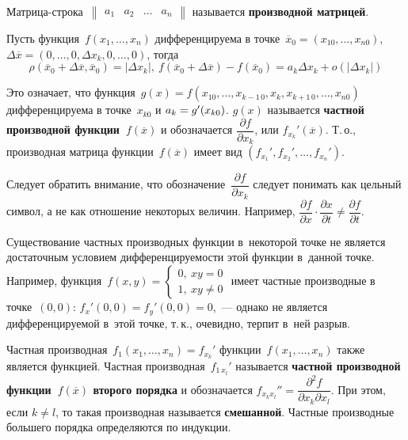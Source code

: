  Матрица-строка~$\begin{Vmatrix}
a_1 & a_2 & \ldots & a_n
\end{Vmatrix}$ называется \textbf{производной матрицей}.

Пусть функция~$f(x_1, \ldots, x_n)$ дифференцируема в точке~$\overline x_0 = (x_{10}, \ldots, x_{n0})$, $\Delta \overline x = (0, \ldots, 0, \Delta x_k, 0, \ldots, 0)$, тогда
\begin{equation*}
\rho(\overline x_0 + \Delta \overline x, \overline x_0) = |\Delta x_k|, \
f(\overline x_0 + \Delta \overline x) - f(\overline x_0) =
a_k \Delta x_k + o(|\Delta x_k|)
\end{equation*}

Это означает, что функция~$g(x) = f(x_{10}, \ldots, x_{k-1\, 0}, x_k, x_{k+1\, 0}, \ldots, x_{n0})$ дифференцируема в точке~$x_{k0}$ и $a_k \opbr= g'(x_{k0})$.
\index{Производная!частная} $g(x)$ называется \textbf{частной производной функции~$f(\overline x)$} и обозначается $\dfrac{\partial f}{\partial x_k}$, или $f_{x_k}'(\overline x)$.
Т.\,о., производная матрица функции~$f(\overline x)$ имеет вид $(f_{x_1}', f_{x_2}', \ldots, f_{x_n}')$.

Следует обратить внимание, что обозначение~$\dfrac{\partial f}{\partial x_k}$ следует понимать как цельный символ, а не как отношение некоторых величин.
Например, $\dfrac{\partial f}{\partial x} \cdot \dfrac{\partial x}{\partial t} \neq \dfrac{\partial f}{\partial t}$.

Существование частных производных функции в~некоторой точке не является достаточным условием дифференцируемости этой функции в~данной точке.
Например, функция~$f(x, y) =
\begin{cases}
0, \ xy = 0 \\
1, \ xy \neq 0
\end{cases}$
имеет частные производные в точке~$(0, 0)$: $f_x'(0, 0) = f_y'(0, 0) = 0$,~--- однако не является дифференцируемой в~этой точке, т.\,к., очевидно, терпит в~ней разрыв.

Частная производная~$f_1(x_1, \ldots, x_n) = f_{x_k}'$ функции~$f(x_1, \ldots, x_n)$ также является функцией.
Частная производная~$f_{1\, x_l}'$ называется \textbf{частной производной функции~$f(\overline x)$ второго порядка} и обозначается $f_{x_k x_l}'' = \dfrac{\partial^2 f}{\partial x_k \partial x_l}$.
При этом, если $k \neq l$, то такая производная называется \textbf{смешанной}.
Частные производные большего порядка определяются по индукции.

